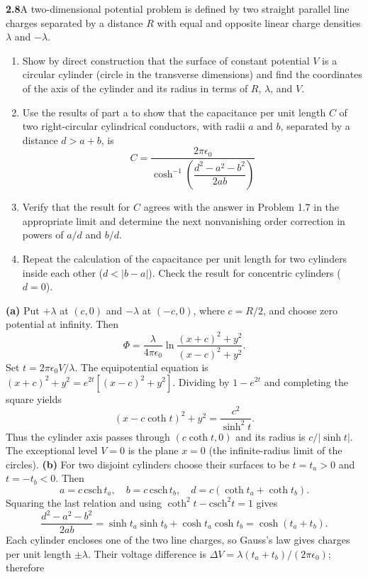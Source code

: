 \par\bigskip
\noindent\textbf{2.8}\quad A two-dimensional potential problem is defined by two straight parallel line charges separated by a distance $R$ with equal and opposite linear charge densities $\lambda$ and $-\lambda$.
\begin{enumerate}
\item[(a)] Show by direct construction that the surface of constant potential $V$ is a circular cylinder (circle in the transverse dimensions) and find the coordinates of the axis of the cylinder and its radius in terms of $R$, $\lambda$, and $V$.
\item[(b)] Use the results of part a to show that the capacitance per unit length $C$ of two right-circular cylindrical conductors, with radii $a$ and $b$, separated by a distance $d>a+b$, is
\[
C=\frac{2\pi\epsilon_{0}}{\cosh^{-1}\!\left(\dfrac{d^{2}-a^{2}-b^{2}}{2ab}\right)}
\]
\item[(c)] Verify that the result for $C$ agrees with the answer in Problem 1.7 in the appropriate limit and determine the next nonvanishing order correction in powers of $a/d$ and $b/d$.
\item[(d)] Repeat the calculation of the capacitance per unit length for two cylinders inside each other ($d<|b-a|$). Check the result for concentric cylinders ($d=0$).
\end{enumerate}
\solution
\textbf{(a)} Put $+\lambda$ at $(c,0)$ and $-\lambda$ at $(-c,0)$,
where $c=R/2$, and choose zero potential at infinity. Then
\[
\Phi=\frac{\lambda}{4\pi\epsilon _0}
 \ln\frac{(x+c)^2+y^2}{(x-c)^2+y^2}.
\]
Set $t=2\pi\epsilon _0V/\lambda$. The equipotential equation is
$(x+c)^2+y^2=e^{2t}[(x-c)^2+y^2]$.
Dividing by $1-e^{2t}$ and completing the square yields
\[
\boxed{(x-c\coth t)^2+y^2=\frac{c^2}{\sinh^2t}.}
\]
Thus the cylinder axis passes through $(c\coth t,0)$ and its radius
is $c/|\sinh t|$. The exceptional level $V=0$ is the plane $x=0$
(the infinite-radius limit of the circles).
\textbf{(b)} For two disjoint cylinders choose their surfaces to be
$t=t_a>0$ and $t=-t_b<0$. Then
\[
a=c\,\mathrm{csch}\,t_a,\quad b=c\,\mathrm{csch}\,t_b,
\quad d=c(\coth t_a+\coth t_b).
\]
Squaring the last relation and using $\coth^2t-\mathrm{csch}^2t=1$
gives
\[
\frac{d^2-a^2-b^2}{2ab}
=\sinh t_a\sinh t_b+\cosh t_a\cosh t_b
=\cosh(t_a+t_b).
\]
Each cylinder encloses one of the two line charges, so Gauss's law
gives charges per unit length $\pm\lambda$. Their voltage difference
is $\Delta V=\lambda(t_a+t_b)/(2\pi\epsilon _0)$; therefore
